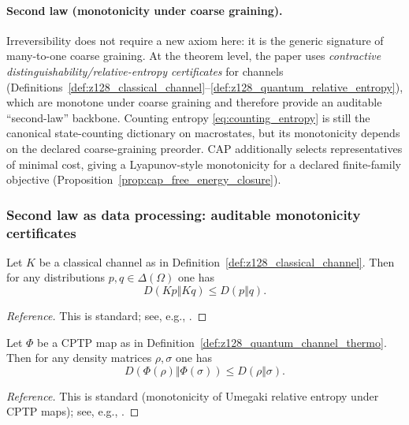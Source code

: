 \paragraph{Second law (monotonicity under coarse graining).}
\InterfaceTag Irreversibility does not require a new axiom here: it is the generic signature of many-to-one coarse graining.
At the theorem level, the paper uses \emph{contractive distinguishability/relative-entropy certificates} for channels (Definitions~\ref{def:z128_classical_channel}--\ref{def:z128_quantum_relative_entropy}), which are monotone under coarse graining and therefore provide an auditable ``second-law'' backbone.
Counting entropy \eqref{eq:counting_entropy} is still the canonical state-counting dictionary on macrostates, but its monotonicity depends on the declared coarse-graining preorder.
CAP additionally selects representatives of minimal cost, giving a Lyapunov-style monotonicity for a declared finite-family objective (Proposition~\ref{prop:cap_free_energy_closure}).

\subsubsection{Second law as data processing: auditable monotonicity certificates}
\label{subsec:second_law_data_processing}

\begin{theorem}
\label{thm:z128_classical_dpi}
\MathTag Let $K$ be a classical channel as in Definition~\ref{def:z128_classical_channel}.
Then for any distributions $p,q\in\Delta(\Omega)$ one has
\[
D(Kp\Vert Kq)\le D(p\Vert q).
\]
\end{theorem}
\begin{proof}[Reference]
This is standard; see, e.g., \cite{CoverThomas2006}.
\end{proof}

\begin{theorem}
\label{thm:z128_quantum_dpi}
\MathTag Let $\Phi$ be a CPTP map as in Definition~\ref{def:z128_quantum_channel_thermo}.
Then for any density matrices $\rho,\sigma$ one has
\[
D(\Phi(\rho)\Vert \Phi(\sigma))\le D(\rho\Vert \sigma).
\]
\end{theorem}
\begin{proof}[Reference]
This is standard (monotonicity of Umegaki relative entropy under CPTP maps); see, e.g., \cite{NielsenChuang2000}.
\end{proof}

